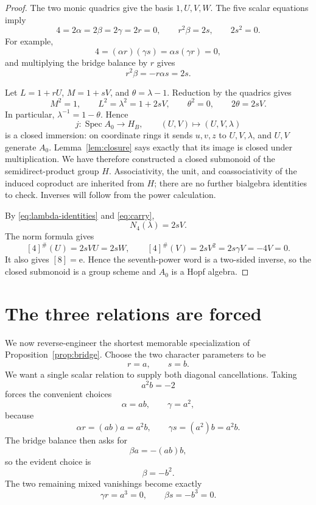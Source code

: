 \documentclass[11pt]{amsart}
\theoremstyle{definition}
\theoremstyle{remark}
\newcommand{\Spec}{\operatorname{Spec}}
\newcommand{\unit}{\mathrm e}
\begin{document}
\begin{proof}
The two monic quadrics give the basis \(1,U,V,W\).  The five scalar
equations imply
\begin{equation}\label{eq:scalar-consequences}
 4=2\alpha=2\beta=2\gamma=2r=0,\qquad
 r^2\beta=2s,\qquad 2s^2=0.
\end{equation}
For example,
\[
 4=(\alpha r)(\gamma s)=\alpha s(\gamma r)=0,
\]
and multiplying the bridge balance by \(r\) gives
\[
 r^2\beta=-r\alpha s=2s.
\]

Let \(L=1+rU\), \(M=1+sV\), and
\(\theta=\lambda-1\).  Reduction by the quadrics gives
\begin{equation}\label{eq:lambda-identities}
 M^2=1,\qquad
 L^2=\lambda^2=1+2sV,\qquad
 \theta^2=0,\qquad
 2\theta=2sV.
\end{equation}
In particular, \(\lambda^{-1}=1-\theta\).  Hence
\[
 j\colon\Spec A_0\longrightarrow H_B,\qquad
 (U,V)\longmapsto(U,V,\lambda)
\]
is a closed immersion: on coordinate rings it sends \(u,v,z\) to
\(U,V,\lambda\), and \(U,V\) generate \(A_0\).  Lemma~\ref{lem:closure}
says exactly that its image is closed under multiplication.  We have
therefore constructed a closed submonoid of the semidirect-product group
\(H\).  Associativity, the unit, and coassociativity of the induced
coproduct are inherited from \(H\); there are no further bialgebra
identities to check.  Inverses will follow from the power calculation.

By \eqref{eq:lambda-identities} and \eqref{eq:carry},
\[
 N_4(\lambda)=2sV.
\]
The norm formula gives
\[
 [4]^\#(U)=2sVU=2sW,
 \qquad
 [4]^\#(V)=2sV^2=2s\gamma V=-4V=0.
\]
It also gives \([8]=\unit\).  Hence the seventh-power word is a two-sided
inverse, so the closed submonoid is a group scheme and \(A_0\) is a Hopf
algebra.
\end{proof}

\section{The three relations are forced}
\label{sec:forced}

We now reverse-engineer the shortest memorable specialization of
Proposition~\ref{prop:bridge}.  Choose the two character parameters to be
\[
 r=a,\qquad s=b.
\]
We want a single scalar relation to supply both diagonal cancellations.
Taking
\[
 a^2b=-2
\]
forces the convenient choices
\[
 \alpha=ab,\qquad \gamma=a^2,
\]
because
\[
 \alpha r=(ab)a=a^2b,\qquad
 \gamma s=(a^2)b=a^2b.
\]
The bridge balance then asks for
\[
 \beta a=-(ab)b,
\]
so the evident choice is
\[
 \beta=-b^2.
\]
The two remaining mixed vanishings become exactly
\[
 \gamma r=a^3=0,\qquad
 \beta s=-b^3=0.
\]
\end{document}
